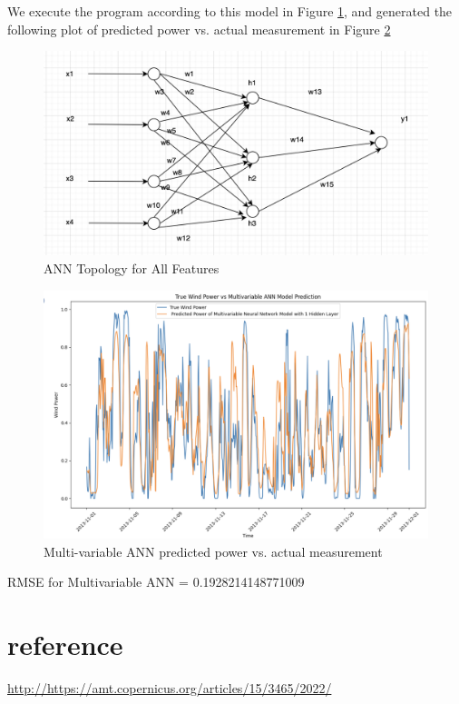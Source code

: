 \documentclass[a4paper, article, oneside, USenglish, IN5460]{memoir}
\begin{document}
{We execute the  program according to this model in Figure \ref{fig:q41}, and generated the following plot of predicted power vs. actual measurement in Figure \ref{fig:q42}


\begin{figure}[H]
\centering
\includegraphics[width=0.8\linewidth]{fig/q41.png}
\caption{\label{fig:q41} \neural ANN Topology for All Features}
\end{figure}

\begin{figure}[H]
\centering
\includegraphics[width=1\linewidth]{fig/q42.png}
\caption{\label{fig:q42} Multi-variable ANN predicted power vs. actual measurement}
\end{figure}
RMSE for Multivariable ANN = 0.1928214148771009

}




\chapter*{reference}
{\url{http://https://amt.copernicus.org/articles/15/3465/2022/}}
\end{document}
